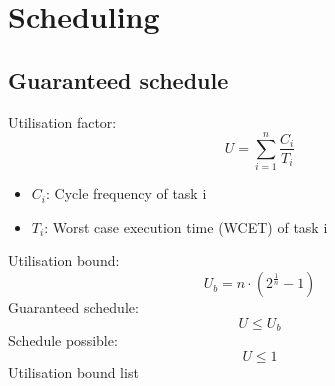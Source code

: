 \section{Scheduling}
\subsection{Guaranteed schedule}
Utilisation factor: 
\[ U = \sum\limits_{i=1}^{n}\frac{C_i}{T_i} \]
\begin{itemize}
    \item[] $C_i$: Cycle frequency of task i
    \item[] $T_i$: Worst case execution time (WCET) of task i
\end{itemize}
Utilisation bound: 
\[ U_b = n \cdot \left(2^{\frac{1}{n}} - 1\right) \]
Guaranteed schedule:
\[ U \leq U_b \]
Schedule possible:
\[ U \leq 1 \]
Utilisation bound list
